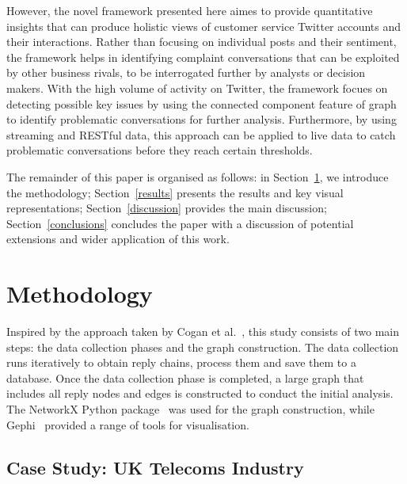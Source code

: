 \documentclass[sigconf]{acmart}
\begin{document}
However, the novel framework presented here aimes to provide
quantitative insights that can produce holistic views of customer
service Twitter accounts and their interactions. Rather than focusing 
on individual posts and their sentiment, the framework helps in identifying
complaint conversations that can be exploited by other business rivals, 
to be interrogated further by analysts or decision makers. With the high 
volume of activity on Twitter, the framework focues on detecting possible 
key issues by using the connected component feature of graph to 
identify problematic conversations for further
analysis. Furthermore, by using streaming and RESTful data, this
approach can be applied to live data to catch problematic
conversations before they reach certain thresholds.

The remainder of this paper is organised as follows: in
Section~\ref{method}, we introduce the methodology;
Section~\ref{results} presents the results and key visual
representations; Section~\ref{discussion} provides the main
discussion; Section~\ref{conclusions} concludes the paper with a
discussion of potential extensions and wider application of this work.


\section{Methodology}\label{method}

Inspired by the approach taken by Cogan et al.~\cite{Cogan2012}, this
study consists of two main steps: the data collection phases and the
graph construction. The data collection runs iteratively to obtain
reply chains, process them and save them to a database. Once the data
collection phase is completed, a large graph that includes all reply
nodes and edges is constructed to conduct the initial analysis. The
NetworkX Python package~\cite{Hagberg2008} was used for the graph
construction, while Gephi~\cite{Bastian2009} provided a range of tools
for visualisation.


\subsection{Case Study: UK Telecoms Industry}
\end{document}
